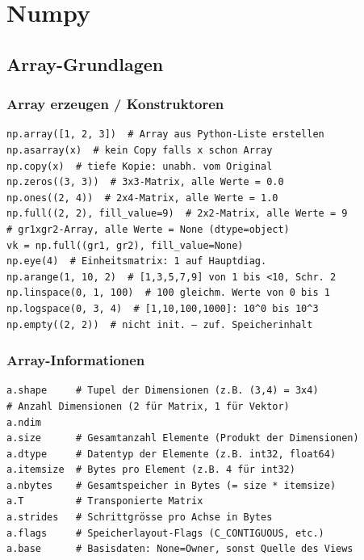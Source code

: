 \section{Numpy}\label{sec:07-numpy}


\subsection{Array-Grundlagen}\label{sec:07-array-grundlagen}
\subsubsection{Array erzeugen / Konstruktoren}\label{sec:07-array-erzeugen}
\begin{codebox}
\begin{lstlisting}[style=CodeExpert]
np.array([1, 2, 3])  # Array aus Python-Liste erstellen
np.asarray(x)  # kein Copy falls x schon Array
np.copy(x)  # tiefe Kopie: unabh. vom Original
np.zeros((3, 3))  # 3x3-Matrix, alle Werte = 0.0
np.ones((2, 4))  # 2x4-Matrix, alle Werte = 1.0
np.full((2, 2), fill_value=9)  # 2x2-Matrix, alle Werte = 9
# gr1xgr2-Array, alle Werte = None (dtype=object)
vk = np.full((gr1, gr2), fill_value=None)
np.eye(4)  # Einheitsmatrix: 1 auf Hauptdiag.
np.arange(1, 10, 2)  # [1,3,5,7,9] von 1 bis <10, Schr. 2
np.linspace(0, 1, 100)  # 100 gleichm. Werte von 0 bis 1
np.logspace(0, 3, 4)  # [1,10,100,1000]: 10^0 bis 10^3
np.empty((2, 2))  # nicht init. – zuf. Speicherinhalt
\end{lstlisting}
\end{codebox}


\subsubsection{Array-Informationen}\label{sec:07-array-informationen}
\begin{codebox}
\begin{lstlisting}[style=CodeExpert]
a.shape     # Tupel der Dimensionen (z.B. (3,4) = 3x4)
# Anzahl Dimensionen (2 für Matrix, 1 für Vektor)
a.ndim
a.size      # Gesamtanzahl Elemente (Produkt der Dimensionen)
a.dtype     # Datentyp der Elemente (z.B. int32, float64)
a.itemsize  # Bytes pro Element (z.B. 4 für int32)
a.nbytes    # Gesamtspeicher in Bytes (= size * itemsize)
a.T         # Transponierte Matrix
a.strides   # Schrittgrösse pro Achse in Bytes
a.flags     # Speicherlayout-Flags (C_CONTIGUOUS, etc.)
a.base      # Basisdaten: None=Owner, sonst Quelle des Views
\end{lstlisting}
\end{codebox}


